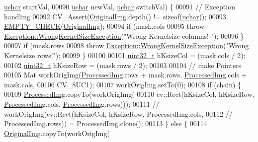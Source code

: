 \begin{DoxyCode}
      \hyperlink{_soil_math_types_8h_a65f85814a8290f9797005d3b28e7e5fc}{uchar} startVal,
00090                                  \hyperlink{_soil_math_types_8h_a65f85814a8290f9797005d3b28e7e5fc}{uchar} newVal, \hyperlink{_soil_math_types_8h_a65f85814a8290f9797005d3b28e7e5fc}{uchar} switchVal) \{
00091   \textcolor{comment}{// Exception handling}
00092   CV\_Assert(\hyperlink{class_vision_1_1_image_processing_a77c370dab270158a4e9c634e2d3f48e7}{OriginalImg}.depth() != \textcolor{keyword}{sizeof}(\hyperlink{_soil_math_types_8h_a65f85814a8290f9797005d3b28e7e5fc}{uchar}));
00093   \hyperlink{_image_processing_8h_a27c4e53b88a0f9f2c097add555131056}{EMPTY\_CHECK}(\hyperlink{class_vision_1_1_image_processing_a77c370dab270158a4e9c634e2d3f48e7}{OriginalImg});
00094   \textcolor{keywordflow}{if} (mask.cols %
00095     \textcolor{keywordflow}{throw} \hyperlink{class_vision_1_1_exception_1_1_wrong_kernel_size_exception}{Exception::WrongKernelSizeException}(\textcolor{stringliteral}{"Wrong Kernelsize columns!
      "});
00096   \}
00097   \textcolor{keywordflow}{if} (mask.rows %
00098     \textcolor{keywordflow}{throw} \hyperlink{class_vision_1_1_exception_1_1_wrong_kernel_size_exception}{Exception::WrongKernelSizeException}(\textcolor{stringliteral}{"Wrong Kernelsize rows!"});
00099   \}
00100 
00101   \hyperlink{_soil_math_types_8h_a435d1572bf3f880d55459d9805097f62}{uint32\_t} hKsizeCol = (mask.cols / 2);
00102   \hyperlink{_soil_math_types_8h_a435d1572bf3f880d55459d9805097f62}{uint32\_t} hKsizeRow = (mask.rows / 2);
00103 
00104   \textcolor{comment}{// make Pointers}
00105   Mat workOrigImg(\hyperlink{class_vision_1_1_image_processing_aa7d65742882cd1b2a1e4e9cb68809211}{ProcessedImg}.rows + mask.rows, \hyperlink{class_vision_1_1_image_processing_aa7d65742882cd1b2a1e4e9cb68809211}{ProcessedImg}.cols + mask.cols,
00106                   CV\_8UC1);
00107   workOrigImg.setTo(0);
00108   \textcolor{keywordflow}{if} (chain) \{
00109     \hyperlink{class_vision_1_1_image_processing_aa7d65742882cd1b2a1e4e9cb68809211}{ProcessedImg}.copyTo(workOrigImg(
00110         cv::Rect(hKsizeCol, hKsizeRow, \hyperlink{class_vision_1_1_image_processing_aa7d65742882cd1b2a1e4e9cb68809211}{ProcessedImg}.cols, 
      \hyperlink{class_vision_1_1_image_processing_aa7d65742882cd1b2a1e4e9cb68809211}{ProcessedImg}.rows)));
00111     \textcolor{comment}{// workOrigImg(cv::Rect(hKsizeCol, hKsizeRow, ProcessedImg.cols,}
00112     \textcolor{comment}{// ProcessedImg.rows)) = ProcessedImg.clone();}
00113   \} \textcolor{keywordflow}{else} \{
00114     \hyperlink{class_vision_1_1_image_processing_a77c370dab270158a4e9c634e2d3f48e7}{OriginalImg}.copyTo(workOrigImg(

\end{DoxyCode}
